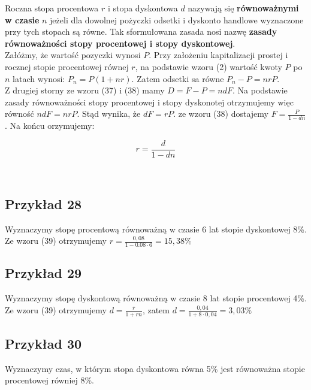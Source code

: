 \documentclass{article}
\begin{document}
Roczna stopa procentowa $ r $ i stopa dyskontowa $ d $ nazywają się \textbf{równoważnymi w czasie} $ n $ jeżeli dla dowolnej pożyczki odsetki i dyskonto handlowe wyznaczone przy tych stopach są równe. Tak sformułowana zasada nosi nazwę \textbf{zasady równoważności stopy procentowej i stopy dyskontowej}.\\

Załóżmy, że wartość pozyczki wynosi $ P $. Przy założeniu kapitalizacji prostej i rocznej stopie procentowej równej $ r $, na podstawie wzoru (2) wartość kwoty $ P $ po $ n $ latach wynosi: $ P_n = P(1 + nr) $. Zatem odsetki sa równe $ P_n - P = nrP $.\\

Z drugiej storny ze wzoru (37) i (38) mamy $ D = F - P = ndF $. Na podstawie zasady równoważności stopy procentowej i stopy dyskonotej otrzymujemy więc równość $ ndF = nrP $. Stąd wynika, że $ dF = rP $. ze wzoru (38) dostajemy $ F = \frac{P}{1 - dn} $. Na końcu orzymujemy:

\begin{center}
	\begin{equation}
		r = \frac{d}{1 - dn}
	\end{equation}
\end{center}\\

\subsection{Przykład 28}
Wyznaczymy stopę procentową równoważną w czasie 6 lat stopie dyskontowej 8\%.\\

Ze wzoru (39) otrzymujemy $ r = \frac{0,08}{1 - 0.08 \cdot 6} = 15,38\% $

\subsection{Przykład 29}
Wyznaczymy stopę dyskontową równoważną w czasie 8 lat stopie procentowej 4\%.\\

Ze wzoru (39) otrzymujemy $ d = \frac{r}{1 + rn} $, zatem $ d = \frac{0,04}{1 + 8 \cdot 0,04} = 3,03\% $

\subsection{Przykład 30}
Wyznaczymy czas, w którym stopa dyskontowa równa 5\% jest równoważna stopie procentowej równiej 8\%.\\
\end{document}
